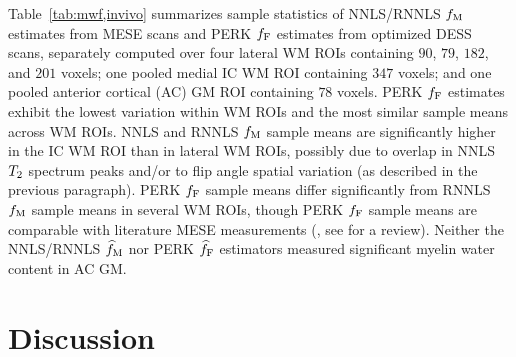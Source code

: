 Table~\ref{tab:mwf,invivo} summarizes sample statistics
of NNLS/RNNLS $f_\mathrm{M}$ estimates from MESE scans
and PERK $f_{\mathrm{F}}$ estimates from optimized DESS scans,
separately computed over four lateral WM ROIs
containing $90$, $79$, $182$, and $201$ voxels;
one pooled medial IC WM ROI containing $347$ voxels;
and one pooled anterior cortical (AC) GM ROI containing $78$ voxels.
PERK $f_{\mathrm{F}}$ estimates exhibit the lowest variation within WM ROIs
and the most similar sample means across WM ROIs.
NNLS and RNNLS $f_\mathrm{M}$ sample means are significantly higher 
in the IC WM ROI than in lateral WM ROIs,
possibly due to overlap in NNLS $T_2$ spectrum peaks
and/or to flip angle spatial variation
(as described in the previous paragraph).
PERK $f_{\mathrm{F}}$ sample means differ significantly 
from RNNLS $f_\mathrm{M}$ sample means
in several WM ROIs,
though PERK $f_{\mathrm{F}}$ sample means are comparable
with literature MESE measurements
(\eg, see \cite{alonsoortiz:15:mbm} for a review).
Neither the NNLS/RNNLS $\widehat{f}_\mathrm{M}$ nor PERK $\widehat{f}_{\mathrm{F}}$ estimators
measured significant myelin water content in AC GM.

\section{Discussion}
\label{s,mwf,disc}







